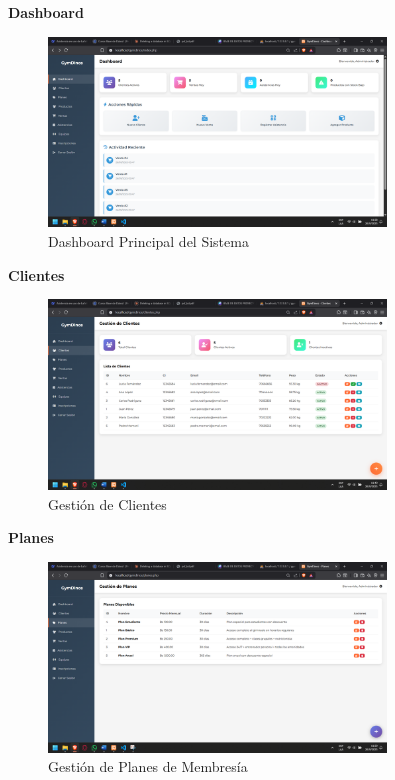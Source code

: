 \documentclass[12pt, letterpaper]{article}
\begin{document}
\textbf{Dashboard}
\begin{figure}[ht]
\centering
\includegraphics[width=0.8\textwidth]{dashboard.png}
\caption{Dashboard Principal del Sistema}
\label{fig:dashboard}
\end{figure}
\newpage

\textbf{Clientes}
\begin{figure}[ht]
\centering
\includegraphics[width=0.8\textwidth]{clientes.png}
\caption{Gestión de Clientes}
\label{fig:clientes}
\end{figure}

\textbf{Planes}
\begin{figure}[ht]
\centering
\includegraphics[width=0.8\textwidth]{planes.png}
\caption{Gestión de Planes de Membresía}
\label{fig:planes}
\end{figure}
\newpage
\end{document}
